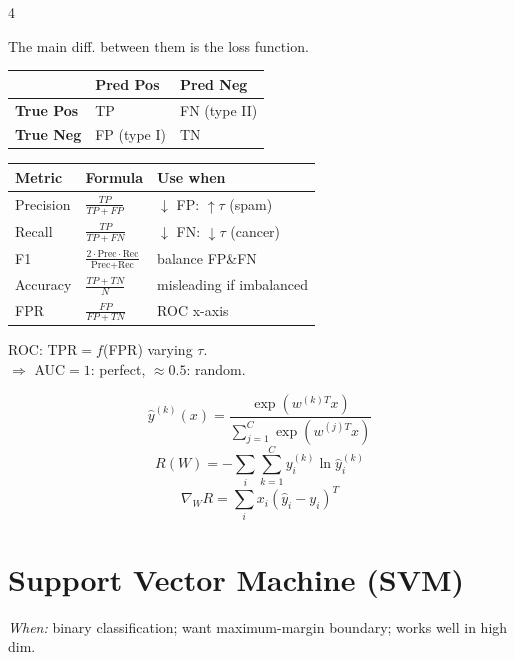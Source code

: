 \documentclass[8pt,a4paper,landscape]{extarticle}
\begin{document}
\begin{multicols*}{4}
\begin{thm}[title=Least Square vs Logistic vs SVM]
The main diff. between them is the loss function.
\end{thm}

\begin{defn}[title=Confusion Matrix]
\renewcommand{\arraystretch}{1.1}
\begin{tabularx}{\linewidth}{@{}lXX@{}}
\toprule
 & \textbf{Pred Pos} & \textbf{Pred Neg}\\
\midrule
\textbf{True Pos} & TP & FN (type II)\\
\textbf{True Neg} & FP (type I) & TN\\
\bottomrule
\end{tabularx}
\end{defn}

\begin{defn}[title=Metrics \& When to Use]
{\renewcommand{\arraystretch}{1.4}
\begin{tabular}{@{}l@{\;}l@{\;}l@{}}
\textbf{Metric} & \textbf{Formula} & \textbf{Use when}\\
\hline
Precision & $\frac{TP}{TP+FP}$ & $\downarrow$ FP: $\uparrow\tau$ (spam)\\
Recall & $\frac{TP}{TP+FN}$ & $\downarrow$ FN: $\downarrow\tau$ (cancer)\\
F1 & $\frac{2\cdot\text{Prec}\cdot\text{Rec}}{\text{Prec}+\text{Rec}}$ & balance FP\&FN\\
Accuracy & $\frac{TP+TN}{N}$ & misleading if imbalanced\\
FPR & $\frac{FP}{FP+TN}$ & ROC x-axis\\
\end{tabular}}
\end{defn}
ROC: TPR$=f$(FPR) varying $\tau$.\;\\ $\Rightarrow$ AUC$=1$: perfect, $\approx0.5$: random.


\begin{prop}[title=Softmax Model (C > 1)]
\[
\hat y^{(k)}(x)=\frac{\exp(w^{(k)T}x)}
{\sum_{j=1}^{C}\exp(w^{(j)T}x)}
\]
\[
R(W)=-\sum_i\sum_{k=1}^{C}y_i^{(k)}\ln\hat y_i^{(k)}
\]
\[
\nabla_WR=\sum_i x_i(\hat y_i-y_i)^T
\]
\end{prop}

\section{Support Vector Machine (SVM)}
\textit{When:} binary classification; want maximum-margin boundary; works well in high dim.


\end{multicols*}
\end{document}
